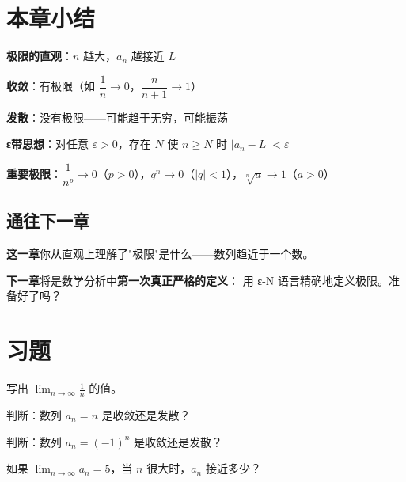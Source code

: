 \section{本章小结}

\begin{progressbox}
\textbf{极限的直观}：\(n\) 越大，\(a_n\) 越接近 \(L\)

\textbf{收敛}：有极限（如 \(\dfrac{1}{n} \to 0\)，\(\dfrac{n}{n+1} \to 1\)）

\textbf{发散}：没有极限——可能趋于无穷，可能振荡

\textbf{ε带思想}：对任意 \(\varepsilon > 0\)，存在 \(N\) 使 \(n \ge N\) 时 \(|a_n - L| < \varepsilon\)

\textbf{重要极限}：\(\dfrac{1}{n^p} \to 0\)（\(p>0\)），\(q^n \to 0\)（\(|q|<1\)），\(\sqrt[n]{a} \to 1\)（\(a>0\)）
\end{progressbox}

\subsection*{通往下一章}

\textbf{这一章}你从直观上理解了"极限"是什么——数列趋近于一个数。

\textbf{下一章}将是数学分析中\textbf{第一次真正严格的定义}：
用 ε-N 语言精确地定义极限。准备好了吗？


\section{习题}


\begin{exercise}[0]
写出 \(\displaystyle\lim_{n\to\infty} \frac{1}{n}\) 的值。
\end{exercise}

\begin{exercise}[0]
判断：数列 \(a_n = n\) 是收敛还是发散？
\end{exercise}

\begin{exercise}[0]
判断：数列 \(a_n = (-1)^n\) 是收敛还是发散？
\end{exercise}

\begin{exercise}[0]
如果 \(\displaystyle\lim_{n\to\infty} a_n = 5\)，当 \(n\) 很大时，\(a_n\) 接近多少？
\end{exercise}

